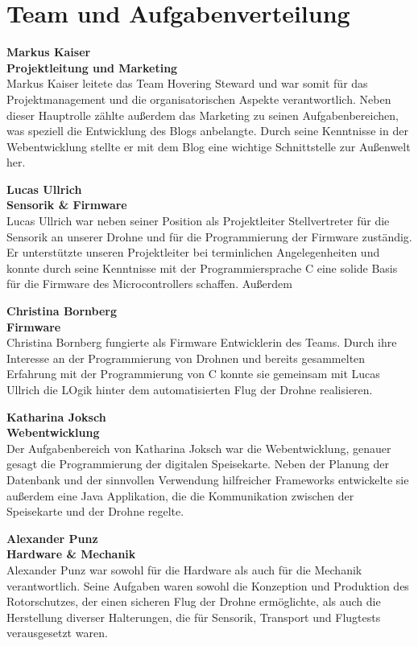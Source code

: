 \section{Team und Aufgabenverteilung}
  \textbf{Markus Kaiser}\\
  \textbf{Projektleitung und Marketing}\\
  Markus Kaiser leitete das Team Hovering Steward und war somit für das Projektmanagement und
  die organisatorischen Aspekte verantwortlich. Neben dieser Hauptrolle zählte außerdem das Marketing
  zu seinen Aufgabenbereichen, was speziell die Entwicklung des Blogs anbelangte. Durch seine Kenntnisse
  in der Webentwicklung stellte er mit dem Blog eine wichtige Schnittstelle zur Außenwelt her.

  \textbf{Lucas Ullrich}\\
  \textbf{Sensorik & Firmware}\\
  Lucas Ullrich war neben seiner Position als Projektleiter Stellvertreter für die Sensorik an unserer Drohne und
  für die Programmierung der Firmware zuständig. Er unterstützte unseren Projektleiter bei terminlichen Angelegenheiten
  und konnte durch seine Kenntnisse mit der Programmiersprache C eine solide Basis für die Firmware des Microcontrollers schaffen.
  Außerdem

  \textbf{Christina Bornberg}\\
  \textbf{Firmware}\\
  Christina Bornberg fungierte als Firmware Entwicklerin des Teams. Durch ihre Interesse an der Programmierung von Drohnen
  und bereits gesammelten Erfahrung mit der Programmierung von C konnte sie gemeinsam mit Lucas Ullrich die LOgik hinter
  dem automatisierten Flug der Drohne realisieren.

  \textbf{Katharina Joksch}\\
  \textbf{Webentwicklung}\\
  Der Aufgabenbereich von Katharina Joksch war die Webentwicklung, genauer gesagt die Programmierung der digitalen Speisekarte.
  Neben der Planung der Datenbank und der sinnvollen Verwendung hilfreicher Frameworks entwickelte sie außerdem eine Java Applikation,
  die die Kommunikation zwischen der Speisekarte und der Drohne regelte.

  \textbf{Alexander Punz}\\
  \textbf{Hardware & Mechanik}\\
  Alexander Punz war sowohl für die Hardware als auch für die Mechanik verantwortlich. Seine Aufgaben waren sowohl die Konzeption
  und Produktion des Rotorschutzes, der einen sicheren Flug der Drohne ermöglichte, als auch die Herstellung diverser Halterungen,
  die für Sensorik, Transport und Flugtests verausgesetzt waren.

